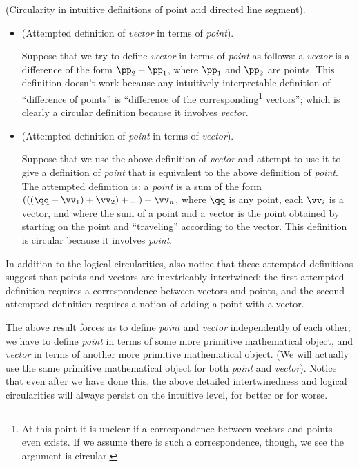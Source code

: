 \begin{deriv}
    (Circularity in intuitive definitions of point and directed line segment).
        
    \begin{itemize}
        \item (Attempted definition of \textit{vector} in terms of \textit{point}). 
        
        Suppose that we try to define \textit{vector} in terms of \textit{point} as follows: a \textit{vector} is a difference of the form $\pp_2 - \pp_1$, where $\pp_1$ and $\pp_2$ are points. This definition doesn't work because any intuitively interpretable definition of ``difference of points'' is ``difference of the corresponding\footnote{At this point it is unclear if a correspondence between vectors and points even exists. If we assume there is such a correspondence, though, we see the argument is circular.} vectors''; which is clearly a circular definition because it involves \textit{vector}.
        
        \item (Attempted definition of \textit{point} in terms of \textit{vector}). 
        
        Suppose that we use the above definition of \textit{vector} and attempt to use it to give a definition of \textit{point} that is equivalent to the above definition of \textit{point}. The attempted definition is: a \textit{point} is a sum of the form $(((\qq + \vv_1) + \vv_2) + ...) + \vv_n$, where $\qq$ is any point, each $\vv_i$ is a vector, and where the sum of a point and a vector is the point obtained by starting on the point and ``traveling'' according to the vector. This definition is circular because it involves \textit{point}.
    \end{itemize}
    
    In addition to the logical circularities, also notice that these attempted definitions suggest that points and vectors are inextricably intertwined: the first attempted definition requires a correspondence between vectors and points, and the second attempted definition requires a notion of adding a point with a vector.
\end{deriv}

The above result forces us to define \textit{point} and \textit{vector} independently of each other; we have to define \textit{point} in terms of some more primitive mathematical object, and \textit{vector} in terms of another more primitive mathematical object. (We will actually use the same primitive mathematical object for both \textit{point} and \textit{vector}). Notice that even after we have done this, the above detailed intertwinedness and logical circularities will always persist on the intuitive level, for better or for worse.

